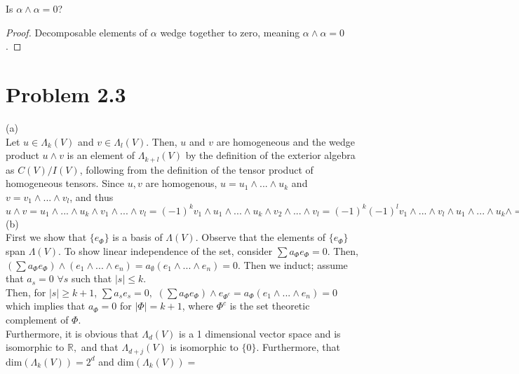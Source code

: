 \documentclass[paper=a4, fontsize=11pt]{scrartcl} %
\numberwithin{equation}{section} %
\numberwithin{figure}{section} %
\numberwithin{table}{section} %
\begin{document}
Is $\alpha \wedge \alpha = 0$?

\begin{proof}
Decomposable elements of $\alpha$ wedge together to zero, meaning $\alpha \wedge \alpha = 0$.
\end{proof}

\section*{Problem 2.3}

(a) \\ Let $u \in \Lambda_k (V)$ and $v \in \Lambda_l (V)$. Then, $u$ and $v$ are homogeneous and the wedge product $u \wedge v$ is an element of $\Lambda_{k+l} (V)$ by the definition of the exterior algebra as $C(V)/I(V)$, following from the definition of the tensor product of homogeneous tensors. Since $u,v$ are homogenous, $u = u_1 \wedge ...\wedge u_k$ and $v = v_1 \wedge ...\wedge v_l$, and thus $u \wedge v = u_1 \wedge ...\wedge u_k \wedge v_1 \wedge ...\wedge v_l = (-1)^k v_1 \wedge u_1 \wedge ...\wedge u_k \wedge v_2 \wedge ...\wedge v_l = (-1)^k (-1)^l v_1 \wedge ...\wedge v_l \wedge u_1 \wedge ...\wedge u_k \wedge = (-1)^{kl} v \wedge u$ \\

(b) \\ First we show that $\{e_{\Phi}\}$ is a basis of $\Lambda(V)$. Observe that the elements of $\{e_{\Phi}\}$ span $\Lambda(V)$. To show linear independence of the set, consider $\sum a_\Phi e_\Phi = 0$. Then, $(\sum a_\Phi e_\Phi) \wedge (e_1 \wedge ... \wedge e_n) = a_{\emptyset}(e_1 \wedge ... \wedge e_n) = 0.$ Then we induct; assume that $a_s = 0$ $\forall s$ such that $|s| \leq k$. \\
Then, for $|s| \geq k+1$,  $\sum a_s e_s = 0, $  $(\sum a_\Phi e_\Phi) \wedge e_{\Phi^c} = a_{\Phi}(e_1 \wedge ...\wedge e_n) = 0$ which implies that $a_\Phi = 0$ for $|\Phi| = k+1$, where $\Phi^c$ is the set theoretic complement of $\Phi$. \\

Furthermore, it is obvious that $\Lambda_d(V)$ is a 1 dimensional vector space and is isomorphic to $\mathbb{R},$ and that $\Lambda_{d+j}(V)$ is isomorphic to $\{0\}$. Furthermore, that dim$(\Lambda_k(V)) = 2^d$ and dim$(\Lambda_k(V)) = $
\end{document}
